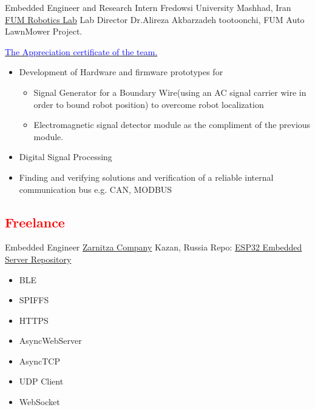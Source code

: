     {Embedded Engineer and Research Intern}
    {Fredowsi University}
    {Mashhad, Iran}
    {
    \newline
    \href{https://www.fumrobotics.ir/people/}{\color{blue}FUM Robotics Lab}
    Lab Director Dr.Alireza Akbarzadeh tootoonchi, FUM Auto LawnMower Project. 
    }
    {
    \href{https://drive.google.com/file/d/18mR13rZAn1kt_DuWFklTObaAwn6ODe9N/view?usp=sharing}{\textcolor{blue}{The Appreciation certificate of the team.}}
    \begin{itemize}
    \item Development of Hardware and firmware prototypes for 
        \begin{itemize}
            \item  Signal Generator for a Boundary Wire(using an AC signal carrier wire in order to bound robot position) to overcome robot localization 
            \item  Electromagnetic signal detector module as the compliment of the previous module.
        \end{itemize}
    \item Digital Signal Processing
    \item Finding and verifying solutions and verification of a reliable internal communication bus e.g. CAN, MODBUS
    \end{itemize}
    }


\vspace{2mm}

\subsection{\Large{\textcolor{red}{Freelance}}}

        {Embedded Engineer}
        {\href{https://zarnitza.ru/}{\color{blue}Zarnitza Company}}
        {Kazan, Russia}
        {
        \newline
        Repo: \href{https://github.com/Ehsan2754/embedded-server}{\color{blue}ESP32 Embedded Server Repository}
        } 
        {
        \begin{itemize}
            \item  BLE
            \item SPIFFS
            \item HTTPS 
            \item AsyncWebServer
            \item AsyncTCP 
            \item UDP Client
            \item WebSocket
        \end{itemize}
        }
        
